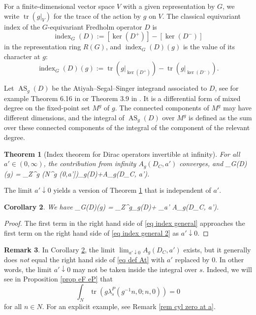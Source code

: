 \documentclass[11pt]{article}
\theoremstyle{plain}
\newtheorem{theorem}{Theorem}[section]
\newtheorem{corollary}[theorem]{Corollary}
\theoremstyle{definition}
\newtheorem{remark}[theorem]{Remark}
\theoremstyle{remark}
\numberwithin{equation}{section}
\DeclareMathOperator{\tr}{tr}
\DeclareMathOperator{\AS}{AS}
\DeclareMathOperator{\ind}{index}
\begin{document}
For a finite-dimensional vector space $V$ with a given representation by $G$, we write $\tr(g|_V)$ for the trace of the action by $g$ on $V$.
%
The classical equivariant index of the $G$-equivariant Fredholm operator $D$ is
\[
\ind_G(D) := [\ker(D^+)] - [\ker(D^-)]
\]
 in the representation ring $R(G)$, and $\ind_G(D)(g)$ is the value of its character at $g$:
\[
\ind_G(D)(g) := \tr(g|_{\ker(D^+)}) - \tr(g|_{\ker(D^-)}).
\]


Let $\AS_g(D)$ be the Atiyah--Segal--Singer integrand associated to $D$, see for example Theorem 6.16 in \cite{BGV} or Theorem 3.9 in \cite{ASIII}. It is a differential form of mixed degree on the fixed-point set $M^g$ of $g$. The connected components of $M^g$ may have different dimensions, and the integral of $\AS_g(D)$ over $M^g$ is defined as the sum over these connected components of the integral of the component of the relevant degree.
\begin{theorem}[Index theorem for Dirac operators invertible at infinity]\label{thm index general}
For all $a' \in (0,\infty)$,
the contribution from infinity $A_{g}(D_C, a')$ converges, and
\ind_G(D)(g) = \int_{Z^g \cup (N^g \times (0,a'])}\AS_g(D)+A_{g}(D_C, a').
\eeq
\end{theorem}

The limit $a' \downarrow 0$ yields a version of Theorem \ref{thm index general} that is independent of $a'$.
\begin{corollary} \label{cor index general}
We have
\ind_G(D)(g) = \int_{Z^g}\AS_g(D)+ \lim_{a' }A_{g}(D_C, a').
\eeq
\end{corollary}
\begin{proof}
The first term in the right hand side of \eqref{eq index general} approaches the first term on the right hand side of \eqref{eq index general 2} as $a' \downarrow 0$.
\end{proof}

\begin{remark}\label{rem zero at a}
In Corollary \ref{cor index general}, the limit $\lim_{a' \downarrow 0}A_{g}(D_C, a')$ exists, but it generally does \emph{not} equal the right hand side of \eqref{eq def At} with $a'$ replaced by $0$. In other words, the limit $a' \downarrow 0$ may not be taken inside the integral over $s$. Indeed, we will see in Proposition \ref{prop eF eP} that
\[
\int_N \tr(g \lambda_s^P(g^{-1}n, 0; n, 0)) = 0
\]
for all $n \in N$. For an explicit example, see Remark \ref{rem cyl zero at a}.
\end{remark}
\end{document}
